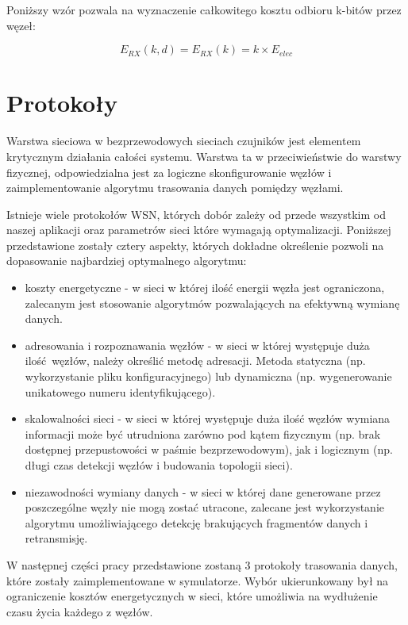\documentclass[a4paper,12pt,twoside,openany]{report}
\begin{document}
Poniższy wzór pozwala na wyznaczenie całkowitego kosztu odbioru k-bitów przez węzeł:

\[E_{RX}(k,d) = E_{RX}(k) = k \times E_{elec}\]

\section{Protokoły}

Warstwa sieciowa w bezprzewodowych sieciach czujników jest elementem krytycznym działania całości systemu.
Warstwa ta w przeciwieństwie do warstwy fizycznej, odpowiedzialna jest za logiczne skonfigurowanie węzłów i
zaimplementowanie algorytmu trasowania danych pomiędzy węzłami.

Istnieje wiele protokołów WSN, których dobór zależy od przede wszystkim od naszej aplikacji oraz
parametrów sieci które wymagają optymalizacji. Poniższej przedstawione zostały cztery aspekty, których dokładne określenie pozwoli
na dopasowanie najbardziej optymalnego algorytmu:

\begin{itemize}
 \item koszty energetyczne - w sieci w której ilość energii węzła jest ograniczona, zalecanym jest stosowanie algorytmów pozwalających
       na efektywną wymianę danych.
 \item adresowania i rozpoznawania węzłów - w sieci w której występuje duża ilość węzłów, należy określić metodę adresacji.
       Metoda statyczna (np. wykorzystanie pliku konfiguracyjnego) lub dynamiczna (np. wygenerowanie unikatowego numeru identyfikującego).
 \item skalowalności sieci - w sieci w której występuje duża ilość węzłów wymiana informacji może być utrudniona zarówno pod kątem fizycznym
       (np. brak dostępnej przepustowości w paśmie bezprzewodowym), jak i logicznym (np. długi czas detekcji węzłów i budowania topologii sieci).
 \item niezawodności wymiany danych - w sieci w której dane generowane przez poszczególne węzły nie mogą zostać utracone, zalecane jest wykorzystanie
       algorytmu umożliwiającego detekcję brakujących fragmentów danych i retransmisję.
\end{itemize}

W następnej części pracy przedstawione zostaną 3 protokoły trasowania danych, które zostały zaimplementowane w symulatorze.
Wybór ukierunkowany był na ograniczenie kosztów energetycznych w sieci, które umożliwia na wydłużenie czasu życia każdego z węzłów.
\end{document}
